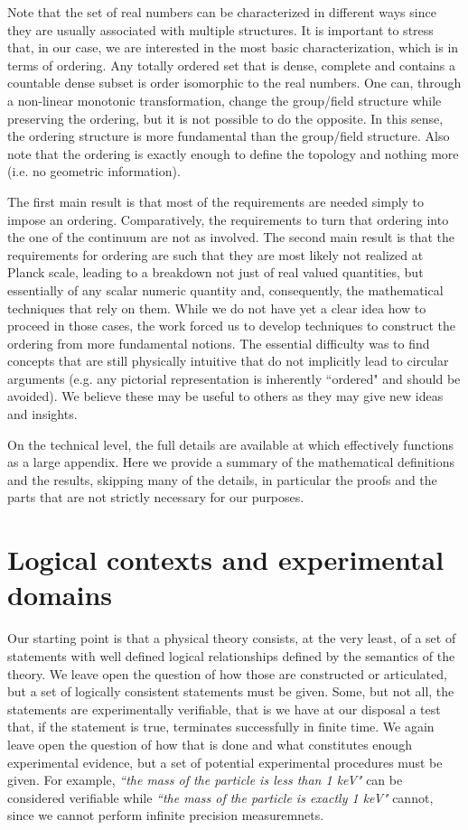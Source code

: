 \documentclass{article}
\newcommand{\statement}[1] {\emph{``#1"}}
\begin{document}
Note that the set of real numbers can be characterized in different ways since they are usually associated with multiple structures. It is important to stress that, in our case, we are interested in the most basic characterization, which is in terms of ordering. Any totally ordered set that is dense, complete and contains a countable dense subset is order isomorphic to the real numbers. One can, through a non-linear monotonic transformation, change the group/field structure while preserving the ordering, but it is not possible to do the opposite. In this sense, the ordering structure is more fundamental than the group/field structure. Also note that the ordering is exactly enough to define the topology and nothing more (i.e. no geometric information).

The first main result is that most of the requirements are needed simply to impose an ordering. Comparatively, the requirements to turn that ordering into the one of the continuum are not as involved. The second main result is that the requirements for ordering are such that they are most likely not realized at Planck scale, leading to a breakdown not just of real valued quantities, but essentially of any scalar numeric quantity and, consequently, the mathematical techniques that rely on them. While we do not have yet a clear idea how to proceed in those cases, the work forced us to develop techniques to construct the ordering from more fundamental notions. The essential difficulty was to find concepts that are still physically intuitive that do not implicitly lead to circular arguments (e.g. any pictorial representation is inherently ``ordered" and should be avoided). We believe these may be useful to others as they may give new ideas and insights.

On the technical level, the full details are available at \cite{Carc3} which effectively functions as a large appendix. Here we provide a summary of the mathematical definitions and the results, skipping many of the details, in particular the proofs and the parts that are not strictly necessary for our purposes.

\section{Logical contexts and experimental domains}

Our starting point is that a physical theory consists, at the very least, of a set of statements with well defined logical relationships defined by the semantics of the theory. We leave open the question of how those are constructed or articulated, but a set of logically consistent statements must be given. Some, but not all, the statements are experimentally verifiable, that is we have at our disposal a test that, if the statement is true, terminates successfully in finite time. We again leave open the question of how that is done and what constitutes enough experimental evidence, but a set of potential experimental procedures must be given. For example, \statement{the mass of the particle is less than 1 keV} can be considered verifiable while \statement{the mass of the particle is exactly 1 keV} cannot, since we cannot perform infinite precision measuremnets.
\end{document}
